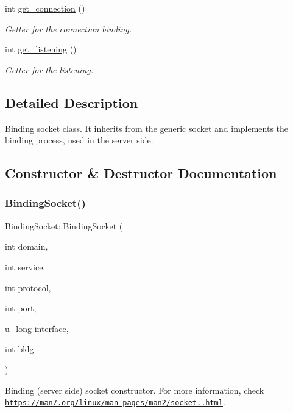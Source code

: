 \begin{DoxyCompactItemize}
int \hyperlink{classBindingSocket_acaf64a54e51eea07f5f7268b805ab3d0}{get\+\_\+connection} ()
\begin{DoxyCompactList}\small\item\em Getter for the connection binding. \end{DoxyCompactList}\item 
int \hyperlink{classBindingSocket_a562609b198ba3db277549ae4d465d1c2}{get\+\_\+listening} ()
\begin{DoxyCompactList}\small\item\em Getter for the listening. \end{DoxyCompactList}\end{DoxyCompactItemize}


\subsection{Detailed Description}
Binding socket class. It inherits from the generic socket and implements the binding process, used in the server side. 

\subsection{Constructor \& Destructor Documentation}
\mbox{\label{classBindingSocket_aee27b67c01411fa363865e92310b015c}} 
\subsubsection{\texorpdfstring{Binding\+Socket()}{BindingSocket()}}
{\footnotesize\ttfamily Binding\+Socket\+::\+Binding\+Socket (\begin{DoxyParamCaption}\item[{int}]{domain,  }\item[{int}]{service,  }\item[{int}]{protocol,  }\item[{int}]{port,  }\item[{u\+\_\+long}]{interface,  }\item[{int}]{bklg }\end{DoxyParamCaption})}



Binding (server side) socket constructor. For more information, check \href{https://man7.org/linux/man-pages/man2/socket.2.html}{\tt https\+://man7.\+org/linux/man-\/pages/man2/socket..\+html}. 


